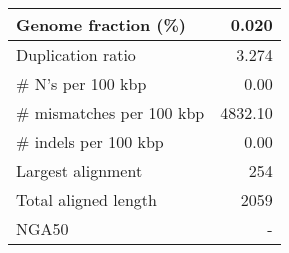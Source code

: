 \documentclass[12pt,a4paper]{article}
\begin{document}
\begin{table}[ht]
\begin{center}
\begin{tabular}{|l*{1}{|r}|}
Genome fraction (\%) & 0.020 \\ \hline
Duplication ratio & 3.274 \\ \hline
\# N's per 100 kbp & 0.00 \\ \hline
\# mismatches per 100 kbp & 4832.10 \\ \hline
\# indels per 100 kbp & 0.00 \\ \hline
Largest alignment & 254 \\ \hline
Total aligned length & 2059 \\ \hline
NGA50 & - \\ \hline
\end{tabular}
\end{center}
\end{table}
\end{document}
